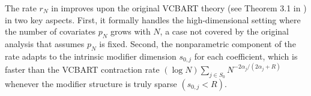 \documentclass[11pt]{article}
\theoremstyle{plain}
\theoremstyle{definition}
\theoremstyle{plain}
\begin{document}
The rate $r_N$ in  improves upon the original VCBART theory (see Theorem 3.1 in \citet{Deshpande2024}) in two key aspects. 
First, it formally handles the high-dimensional setting where the number of covariates $p_N$ grows with $N$, a case not covered by the original analysis that assumes $p_{N}$ is fixed. 
Second, the nonparametric component of the rate adapts to the intrinsic modifier dimension $s_{0,j}$ for each coefficient, which is faster than the VCBART contraction rate $(\log N)\sum_{j \in S_0} N^{-2 \alpha_j/(2 \alpha_j +R)}$ whenever the modifier structure is truly sparse $(s_{0,j}<R)$. 
\end{document}
